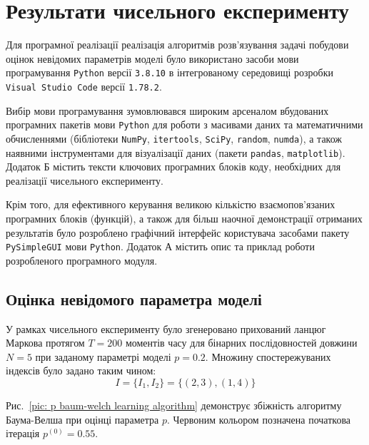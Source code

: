 \chapter{Результати чисельного експерименту}
\label{chap: practice}

Для програмної реалізації реалізація алгоритмів розв’язування задачі побудови оцінок невідомих параметрів моделі було використано засоби мови програмування \texttt{Python} версії \texttt{3.8.10} в інтегрованому середовищі розробки \texttt{Visual Studio Code} версії \texttt{1.78.2}.

Вибір мови програмування зумовлювався широким арсеналом вбудованих програмних пакетів мови \texttt{Python} для роботи з масивами даних та математичними обчисленнями (бібліотеки \texttt{NumPy}, \texttt{itertools}, \texttt{SciPy}, \texttt{random}, \texttt{numda}), а також наявними інструментами для візуалізації даних (пакети \texttt{pandas}, \texttt{matplotlib}). Додаток Б містить тексти ключових програмних блоків коду, необхідних для реалізації чисельного експерименту.

Крім того, для ефективного керування великою кількістю взаємопов'язаних програмних блоків (функцій), а також для більш наочної демонстрації отриманих результатів було розроблено графічний інтерфейс користувача засобами пакету \texttt{PySimpleGUI} мови \texttt{Python}. Додаток А містить опис та приклад роботи розробленого програмного модуля.

\section{Оцінка невідомого параметра моделі}

У рамках чисельного експерименту було згенеровано прихований ланцюг Маркова протягом $T=200$ моментів часу для бінарних послідовностей довжини $N=5$ при заданому параметрі моделі $p=0.2$. Множину спостережуваних індексів було задано таким чином:
\begin{equation}\label{eq: example observed indexes}
    I=\{I_1,I_2\}=\{(2,3),(1,4)\}
\end{equation} 

Рис.~\ref{pic: p baum-welch learning algorithm} демонструє збіжність алгоритму Баума-Велша при оцінці параметра $p$. Червоним кольором позначена початкова ітерація $p^{(0)}=0.55$.


